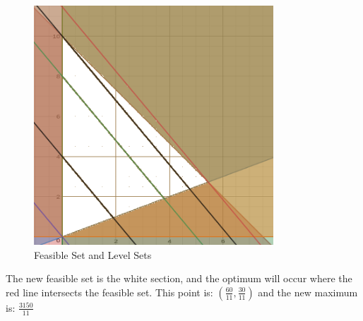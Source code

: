 \documentclass[12pt, letterpaper]{paper}
\begin{document}
\begin{figure}[!h]
\centering
\includegraphics[width=0.8\textwidth]{q5d.png}
\caption{ Feasible Set and Level Sets }
\end{figure}

The new feasible set is the white section, and the optimum will occur where the red line intersects the feasible set. This point is: $(\frac{60}{11}, \frac{30}{11})$ and the new maximum is: $\frac{3150}{11}$
\end{document}
